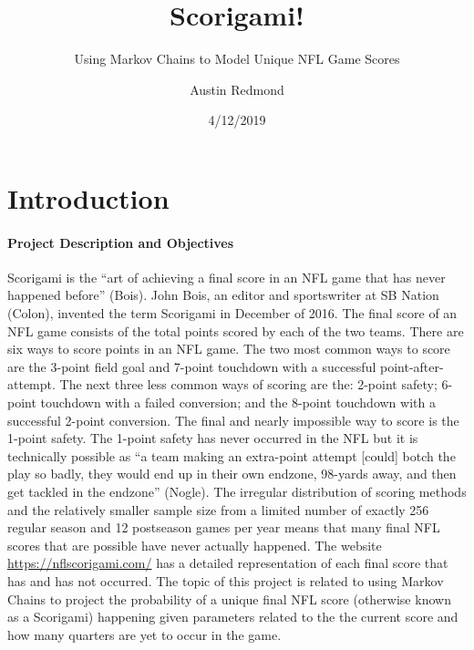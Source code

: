 \documentclass[
]{article}
\title{Scorigami!}
\subtitle{Using Markov Chains to Model Unique NFL Game Scores}
\author{Austin Redmond}
\date{4/12/2019}
\let\oldparagraph\paragraph
\renewcommand{\paragraph}[1]{\oldparagraph{#1}\mbox{}}
\begin{document}
\maketitle

\hypertarget{introduction}{%
\section{Introduction}\label{introduction}}

\hypertarget{project-description-and-objectives}{%
\paragraph{Project Description and
Objectives}\label{project-description-and-objectives}}

Scorigami is the ``art of achieving a final score in an NFL game that
has never happened before'' (Bois). John Bois, an editor and
sportswriter at SB Nation (Colon), invented the term Scorigami in
December of 2016. The final score of an NFL game consists of the total
points scored by each of the two teams. There are six ways to score
points in an NFL game. The two most common ways to score are the 3-point
field goal and 7-point touchdown with a successful point-after-attempt.
The next three less common ways of scoring are the: 2-point safety;
6-point touchdown with a failed conversion; and the 8-point touchdown
with a successful 2-point conversion. The final and nearly impossible
way to score is the 1-point safety. The 1-point safety has never
occurred in the NFL but it is technically possible as ``a team making an
extra-point attempt {[}could{]} botch the play so badly, they would end
up in their own endzone, 98-yards away, and then get tackled in the
endzone'' (Nogle). The irregular distribution of scoring methods and the
relatively smaller sample size from a limited number of exactly 256
regular season and 12 postseason games per year means that many final
NFL scores that are possible have never actually happened. The website
\url{https://nflscorigami.com/} has a detailed representation of each
final score that has and has not occurred. The topic of this project is
related to using Markov Chains to project the probability of a unique
final NFL score (otherwise known as a Scorigami) happening given
parameters related to the the current score and how many quarters are
yet to occur in the game.
\end{document}
